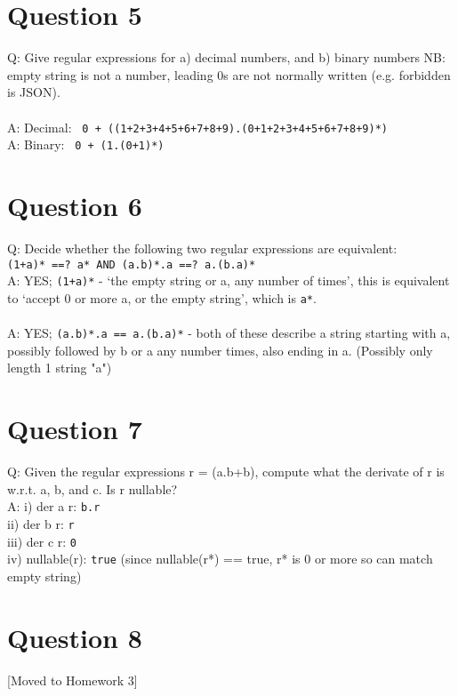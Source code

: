 \documentclass[english]{scrartcl}
\begin{document}
\section*{Question 5}
Q: Give regular expressions for a) decimal numbers, and b) binary numbers
NB: empty string is not a number, leading 0s are not normally written (e.g. forbidden is JSON).\\
\\
A: Decimal: \verb~ 0 + ((1+2+3+4+5+6+7+8+9).(0+1+2+3+4+5+6+7+8+9)*) ~ \\
A: Binary: \verb~ 0 + (1.(0+1)*) ~

\section*{Question 6}
Q: Decide whether the following two regular expressions are equivalent: \\
\verb|(1+a)* ==? a* AND (a.b)*.a ==? a.(b.a)*|
\\
A: YES; \verb|(1+a)*| - `the empty string or a, any number of times', this is equivalent to `accept 0 or more a, or the empty string', which is \verb~a*~. \\
\\
A: YES; \verb|(a.b)*.a == a.(b.a)*| - both of these describe a string starting with a, possibly followed by b or a any number times, also ending in a. (Possibly only length 1 string "a")

\section*{Question 7}
Q: Given the regular expressions r = (a.b+b), compute what the derivate of r is w.r.t. a, b, and c. Is r nullable? \\
A: i) der a r: \verb|b.r| \\
   ii) der b r: \verb|r| \\
   iii) der c r: \verb|0| \\
   iv) nullable(r): \verb|true| (since nullable(r*) == true, r* is 0 or more so can match empty string)

\section*{Question 8}
[Moved to Homework 3]

\end{document}
